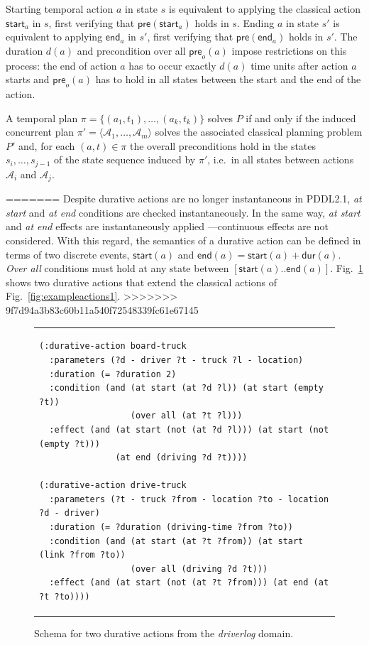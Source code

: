 \documentclass[runningheads]{llncs}
\newcommand{\pre}{\mathsf{pre}}    %
\newcommand{\dur}{\mathsf{dur}}    %
\newcommand{\start}{\mathsf{start}}%
\newcommand{\en}{\mathsf{end}}     %
\begin{document}
Starting temporal action $a$ in state $s$ is equivalent to applying the classical action $\mathsf{start}_a$ in $s$, first verifying that $\mathsf{pre}(\mathsf{start}_a)$ holds in $s$. Ending $a$ in state $s'$ is equivalent to applying $\mathsf{end}_a$ in $s'$, first verifying that $\pre(\mathsf{end}_a)$ holds in $s'$. The duration $d(a)$ and precondition over all $\pre_o(a)$ impose restrictions on this process: the end of action $a$ has to occur exactly $d(a)$ time units after action $a$ starts and $\pre_o(a)$ has to hold in all states between the start and the end of the action. 

A temporal plan $\pi=\{(a_1,t_1),\ldots,(a_k,t_k)\}$ solves $P$ if and only if the induced concurrent plan $\pi'=\langle\mathcal{A}_1,\ldots,\mathcal{A}_m\rangle$ solves the associated classical planning problem $P'$ and, for each $(a,t)\in\pi$ the overall preconditions hold in the states $s_i,\ldots,s_{j-1}$ of the state sequence induced by $\pi'$, i.e.~in all states between actions $\mathcal{A}_i$ and $\mathcal{A}_j$.

=======
Despite durative actions are no longer instantaneous in PDDL2.1, {\em at start} and {\em at end} conditions are checked instantaneously. In the same way, {\em at start} and {\em at end} effects are instantaneously applied ---continuous effects are not considered. With this regard, the semantics of a durative action can be defined in terms of two discrete events, $\start(a)$ and $\en(a)=\start(a)+\dur(a)$.
{\em Over all} conditions must hold at any state between $[\start(a)..\en(a)]$. Fig.~\ref{fig:exampleactions2} shows two durative actions that extend the classical actions of Fig.~\ref{fig:exampleactions1}.
>>>>>>> 9f7d94a3b83c60b11a540f72548339fc61e67145

\begin{figure}
\begin{tabular}{p{\textwidth}}
\begin{verbatim}
(:durative-action board-truck
  :parameters (?d - driver ?t - truck ?l - location)
  :duration (= ?duration 2)
  :condition (and (at start (at ?d ?l)) (at start (empty ?t))
                  (over all (at ?t ?l)))
  :effect (and (at start (not (at ?d ?l))) (at start (not (empty ?t)))
               (at end (driving ?d ?t))))

(:durative-action drive-truck
  :parameters (?t - truck ?from - location ?to - location ?d - driver)
  :duration (= ?duration (driving-time ?from ?to))
  :condition (and (at start (at ?t ?from)) (at start (link ?from ?to))
                  (over all (driving ?d ?t)))
  :effect (and (at start (not (at ?t ?from))) (at end (at ?t ?to))))
\end{verbatim}
\end{tabular}
\label{fig:exampleactions2}
\caption{\small Schema for two durative actions from the {\em driverlog} domain.}
\end{figure}
\end{document}
